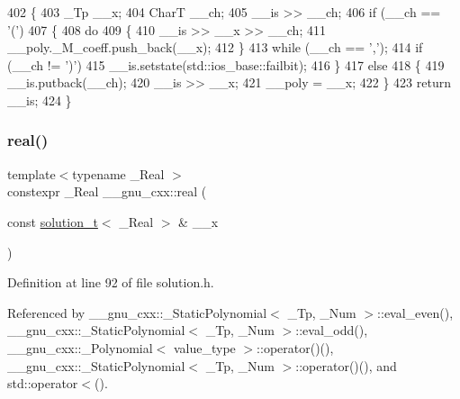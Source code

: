 \begin{DoxyCode}
402     \{
403       \_Tp \_\_x;
404       CharT \_\_ch;
405       \_\_is >> \_\_ch;
406       \textcolor{keywordflow}{if} (\_\_ch == \textcolor{charliteral}{'('})
407         \{
408           \textcolor{keywordflow}{do}
409             \{
410               \_\_is >> \_\_x >> \_\_ch;
411               \_\_poly.\_M\_coeff.push\_back(\_\_x);
412             \}
413           \textcolor{keywordflow}{while} (\_\_ch == \textcolor{charliteral}{','});
414           \textcolor{keywordflow}{if} (\_\_ch != \textcolor{charliteral}{')'})
415             \_\_is.setstate(std::ios\_base::failbit);
416         \}
417       \textcolor{keywordflow}{else}
418         \{
419           \_\_is.putback(\_\_ch);
420           \_\_is >> \_\_x;
421           \_\_poly = \_\_x;
422         \}
423       \textcolor{keywordflow}{return} \_\_is;
424     \}
\end{DoxyCode}
\mbox{\label{namespace____gnu__cxx_a2743043701f8e4c87d3f0f06ddb11348}} 
\subsubsection{\texorpdfstring{real()}{real()}}
{\footnotesize\ttfamily template$<$typename \+\_\+\+Real $>$ \\
constexpr \+\_\+\+Real \+\_\+\+\_\+gnu\+\_\+cxx\+::real (\begin{DoxyParamCaption}\item[{const \hyperlink{namespace____gnu__cxx_ae20ea642de50eb361074c62676b0159c}{solution\+\_\+t}$<$ \+\_\+\+Real $>$ \&}]{\+\_\+\+\_\+x }\end{DoxyParamCaption})}



Definition at line 92 of file solution.\+h.



Referenced by \+\_\+\+\_\+gnu\+\_\+cxx\+::\+\_\+\+Static\+Polynomial$<$ \+\_\+\+Tp, \+\_\+\+Num $>$\+::eval\+\_\+even(), \+\_\+\+\_\+gnu\+\_\+cxx\+::\+\_\+\+Static\+Polynomial$<$ \+\_\+\+Tp, \+\_\+\+Num $>$\+::eval\+\_\+odd(), \+\_\+\+\_\+gnu\+\_\+cxx\+::\+\_\+\+Polynomial$<$ value\+\_\+type $>$\+::operator()(), \+\_\+\+\_\+gnu\+\_\+cxx\+::\+\_\+\+Static\+Polynomial$<$ \+\_\+\+Tp, \+\_\+\+Num $>$\+::operator()(), and std\+::operator$<$().


